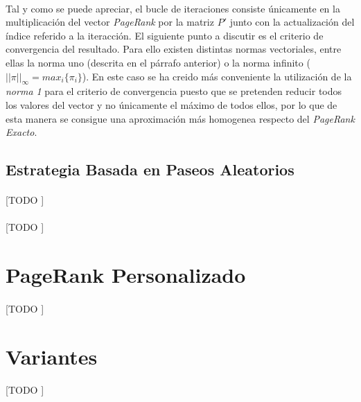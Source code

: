 \documentclass{subfiles}
\begin{document}
        \paragraph{}
        Tal y como se puede apreciar, el bucle de iteraciones consiste únicamente en la multiplicación del vector \emph{PageRank} por la matriz $P'$ junto con la actualización del índice referido a la iteracción. El siguiente punto a discutir es el criterio de convergencia del resultado. Para ello existen distintas normas vectoriales, entre ellas la norma uno (descrita en el párrafo anterior) o la norma infinito ($||\pi||_{\infty}=max_i\{\pi_i\}$). En este caso se ha creido más conveniente la utilización de la \emph{norma 1} para el criterio de convergencia puesto que se pretenden reducir todos los valores del vector y no únicamente el máximo de todos ellos, por lo que de esta manera se consigue una aproximación más homogenea respecto  del \emph{PageRank Exacto}.

      \subsection{Estrategia Basada en Paseos Aleatorios}
      \label{sec:pagerank_algorithm_random_walks}

        \paragraph{}
        [TODO ]

        \paragraph{}
        [TODO ]

    \section{PageRank Personalizado}
    \label{sec:pagerank_algorithm_personalized}

      \paragraph{}
      [TODO ]

    \section{Variantes}
    \label{sec:pagerank_variants}

      \paragraph{}
      [TODO ]
\end{document}
